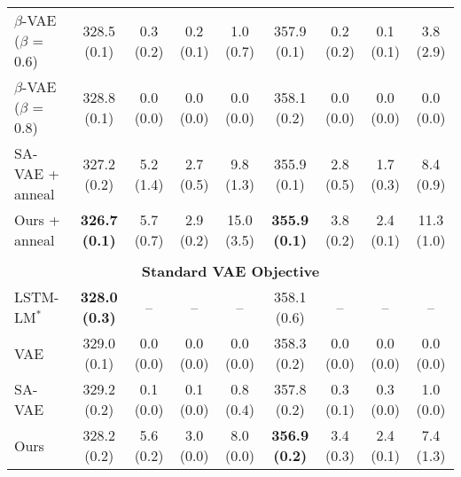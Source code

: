 \documentclass{article} \usepackage{iclr2019_conference,times}
\begin{document}
\begin{table}[!t]
{\begin{tabular}{lcccc|cccc}
    $\beta$-VAE ($\beta$ = 0.6) &328.5 (0.1)  &0.3 (0.2)   &0.2 (0.1)  &1.0 (0.7) &357.9 (0.1)  &0.2 (0.2)  &0.1 (0.1) & 3.8 (2.9)  \\
    $\beta$-VAE ($\beta$ = 0.8) &328.8 (0.1)   &0.0 (0.0)   &0.0 (0.0) &0.0 (0.0)  &358.1 (0.2)  &0.0 (0.0)  &0.0 (0.0) & 0.0 (0.0) \\
    SA-VAE + anneal             &327.2 (0.2) &5.2 (1.4)   &2.7 (0.5)   &9.8 (1.3) &355.9 (0.1)           &2.8 (0.5)     &1.7 (0.3) & 8.4 (0.9) \\
    Ours + anneal               &\textbf{326.7 (0.1)}  &5.7 (0.7)   &2.9 (0.2)  &15.0 (3.5) &\textbf{355.9 (0.1)}  &3.8 (0.2)     &2.4 (0.1)  & 11.3 (1.0) \\
    \midrule
    \vspace{-9pt} \\
    \multicolumn{9}{c}{\bf Standard VAE Objective} \vspace{3pt} \\
    LSTM-LM$^\ast$              &\textbf{328.0 (0.3)}                 &--    &--   &-- &358.1 (0.6)           &--      &--   &-- \\
    VAE                         &329.0 (0.1)   &0.0 (0.0)   &0.0 (0.0) &0.0 (0.0)   &358.3 (0.2)          &0.0 (0.0)     &0.0 (0.0)   &0.0 (0.0)\\
    SA-VAE                      &329.2 (0.2)  &0.1 (0.0)   &0.1 (0.0) &0.8 (0.4)  &357.8 (0.2)   &0.3 (0.1)     &0.3 (0.0) &1.0 (0.0) \\
    Ours                        &328.2 (0.2)        &5.6 (0.2)   &3.0 (0.0) &8.0 (0.0)  &\textbf{356.9 (0.2)}  &3.4 (0.3)  &2.4 (0.1) &7.4 (1.3)  \\    
    \bottomrule
    \end{tabular}}
\end{table}
\end{document}
